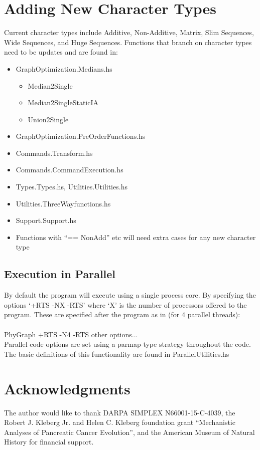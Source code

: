 \documentclass[11pt]{article}
\begin{document}
	\section{Adding New Character Types}
		Current character types include Additive, Non-Additive, Matrix, Slim Sequences, Wide Sequences, and Huge Sequences.  
		Functions that branch on character types need to be updates and are found in:
		\begin{itemize}
			 \item{GraphOptimization.Medians.hs}
			 	\begin{itemize}
			 		\item{Median2Single}
					\item{Median2SingleStaticIA}
					\item{Union2Single}
			 	\end{itemize}
			 \item{GraphOptimization.PreOrderFunctions.hs}
			 \item{Commands.Transform.hs}
			 \item{Commands.CommandExecution.hs}
			 \item{Types.Types.hs, Utilities.Utilities.hs}
			 \item{Utilities.ThreeWayfunctions.hs}
			 \item{Support.Support.hs}
			 \item{Functions with ``== NonAdd'' etc will need extra cases for any new character type}
	\end{itemize}
	\subsection{Execution in Parallel}
	By default the program will execute using a single process core.  By specifying the options `+RTS -NX -RTS' where `X' is the number of processors offered to the program. These are specified after the program as in (for 4 parallel threads):\\
	\\
	PhyGraph +RTS -N4 -RTS other options...  \\
	
	Parallel code options are set using a parmap-type strategy throughout the code.  The basic definitions of this functionality are found in ParallelUtilities.hs
	
	\section*{Acknowledgments}
	The author would like to thank DARPA SIMPLEX N66001-15-C-4039, the  Robert J. Kleberg Jr. and Helen C. Kleberg foundation grant ``Mechanistic Analyses of Pancreatic Cancer Evolution'', and the American Museum of Natural History for financial support.  
	
	\newpage
	
\end{document}
